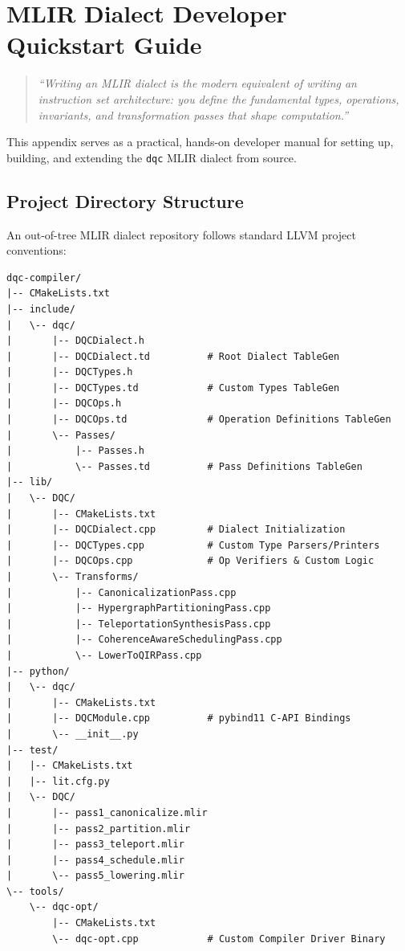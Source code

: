 \chapter{MLIR Dialect Developer Quickstart Guide}
\label{app:mlir_quickstart}

\begin{quote}
\textit{``Writing an MLIR dialect is the modern equivalent of writing an instruction set architecture: you define the fundamental types, operations, invariants, and transformation passes that shape computation.''}
\end{quote}

This appendix serves as a practical, hands-on developer manual for setting up, building, and extending the \texttt{dqc} MLIR dialect from source.

\section{Project Directory Structure}
\label{sec:app_project_structure}

An out-of-tree MLIR dialect repository follows standard LLVM project conventions:

\begin{lstlisting}[language=MLIR, caption={Standard Out-of-Tree MLIR Dialect Directory Hierarchy}]
dqc-compiler/
|-- CMakeLists.txt
|-- include/
|   \-- dqc/
|       |-- DQCDialect.h
|       |-- DQCDialect.td          # Root Dialect TableGen
|       |-- DQCTypes.h
|       |-- DQCTypes.td            # Custom Types TableGen
|       |-- DQCOps.h
|       |-- DQCOps.td              # Operation Definitions TableGen
|       \-- Passes/
|           |-- Passes.h
|           \-- Passes.td          # Pass Definitions TableGen
|-- lib/
|   \-- DQC/
|       |-- CMakeLists.txt
|       |-- DQCDialect.cpp         # Dialect Initialization
|       |-- DQCTypes.cpp           # Custom Type Parsers/Printers
|       |-- DQCOps.cpp             # Op Verifiers & Custom Logic
|       \-- Transforms/
|           |-- CanonicalizationPass.cpp
|           |-- HypergraphPartitioningPass.cpp
|           |-- TeleportationSynthesisPass.cpp
|           |-- CoherenceAwareSchedulingPass.cpp
|           \-- LowerToQIRPass.cpp
|-- python/
|   \-- dqc/
|       |-- CMakeLists.txt
|       |-- DQCModule.cpp          # pybind11 C-API Bindings
|       \-- __init__.py
|-- test/
|   |-- CMakeLists.txt
|   |-- lit.cfg.py
|   \-- DQC/
|       |-- pass1_canonicalize.mlir
|       |-- pass2_partition.mlir
|       |-- pass3_teleport.mlir
|       |-- pass4_schedule.mlir
|       \-- pass5_lowering.mlir
\-- tools/
    \-- dqc-opt/
        |-- CMakeLists.txt
        \-- dqc-opt.cpp            # Custom Compiler Driver Binary
\end{lstlisting}

